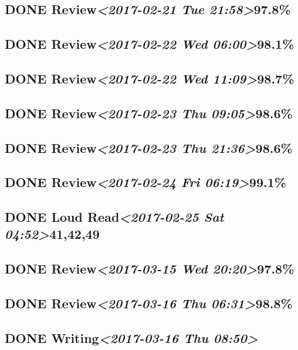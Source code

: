 \documentclass[11pt]{ctexart}
\begin{document}
\subsection{{\bfseries\sffamily DONE} Review\textit{<2017-02-21 Tue 21:58>}97.8\%}
\label{sec:orgcca33bb}
\subsection{{\bfseries\sffamily DONE} Review\textit{<2017-02-22 Wed 06:00>}98.1\%}
\label{sec:org273fb3a}
\subsection{{\bfseries\sffamily DONE} Review\textit{<2017-02-22 Wed 11:09>}98.7\%}
\label{sec:org4e8c789}
\subsection{{\bfseries\sffamily DONE} Review\textit{<2017-02-23 Thu 09:05>}98.6\%}
\label{sec:orge33d372}
\subsection{{\bfseries\sffamily DONE} Review\textit{<2017-02-23 Thu 21:36>}98.6\%}
\label{sec:org9dbdf39}
\subsection{{\bfseries\sffamily DONE} Review\textit{<2017-02-24 Fri 06:19>}99.1\%}
\label{sec:orgc54b16e}
\subsection{{\bfseries\sffamily DONE} Loud Read\textit{<2017-02-25 Sat 04:52>}41,42,49}
\label{sec:orgda5ccb8}
\subsection{{\bfseries\sffamily DONE} Review\textit{<2017-03-15 Wed 20:20>}97.8\%}
\label{sec:orgc45d067}
\subsection{{\bfseries\sffamily DONE} Review\textit{<2017-03-16 Thu 06:31>}98.8\%}
\label{sec:org5110c0c}
\subsection{{\bfseries\sffamily DONE} Writing\textit{<2017-03-16 Thu 08:50>}}
\label{sec:org8ad17a1}
\end{document}
